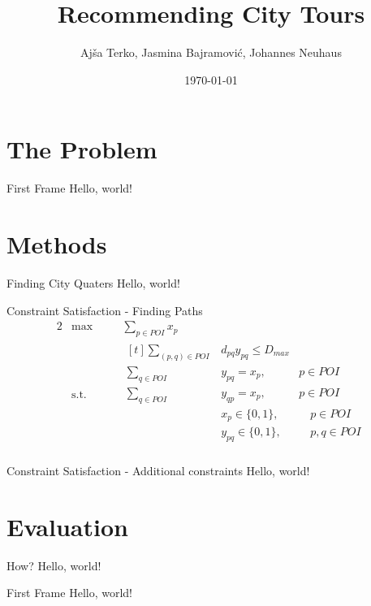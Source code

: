 \documentclass{beamer}
\title{Recommending City Tours}
\date{\today}
\author{Ajša Terko, Jasmina Bajramović, Johannes Neuhaus}
\institute{\url{https://github.com/zonradkuse/city-tour-recsys}}
\begin{document}
  \maketitle
  \section{The Problem}
  \begin{frame}{First Frame}
    Hello, world!
  \end{frame}
  \section{Methods}
  \begin{frame}{Finding City Quaters}
    Hello, world!
  \end{frame}
  \begin{frame}{Constraint Satisfaction - Finding Paths}
      \begin{alignat*}{2}
      & \text{max} & & \sum_{p \in POI} x_p \\
       & \text{s.t.}& \quad & \begin{aligned}[t]
                      \sum_{(p,q) \in POI}& d_{pq} y_{pq} \leq D_{max}& \\[3ex]
                      \sum_{q \in POI}& y_{pq} = x_{p},& p \in POI \\[3ex]
                      \sum_{q \in POI}& y_{qp} = x_{p},& p \in POI \\[3ex]
                      &x_{p} \in \{0,1\}, & \quad p \in POI \\[3ex]
                      &y_{pq} \in \{0,1\}, & \quad p,q \in POI \\[3ex]
                    \end{aligned}
\end{alignat*}
  \end{frame}
  \begin{frame}{Constraint Satisfaction - Additional constraints}
    Hello, world!
  \end{frame}
  \section{Evaluation}
  \begin{frame}{How?}
    Hello, world!
  \end{frame}
  \begin{frame}{First Frame}
    Hello, world!
  \end{frame}
\end{document}
